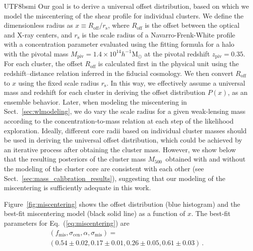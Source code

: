 \documentclass[longauth]{aa}
\newcommand{\Msunh}{\ensuremath{h^{-1}\mathrm{M}_{\odot}}}
\newcommand{\Mfiveoo}{\ensuremath{M_{500}}}
\newcommand{\MPIV}{\ensuremath{M_{\mathrm{piv}}}}
\newcommand{\ZPIV}{\ensuremath{z_{\mathrm{piv}}}}
\newcommand{\fmis}{\ensuremath{f_{\mathrm{mis}}}}
\newcommand{\sigmacen}{\ensuremath{{\sigma}_{\mathrm{cen}}}}
\newcommand{\sigmamis}{\ensuremath{{\sigma}_{\mathrm{mis}}}}
\begin{document}
\begin{CJK*}{UTF8}{bsmi}
Our goal is to derive a universal offset distribution, based on which we model the miscentering of the shear profile for individual clusters. 
We define the dimensionless radius as $x \equiv R_{\mathrm{off}} / r_{\mathrm{s}}$, where $R_{\mathrm{off}}$ is the offset between the optical and X-ray centers, and $r_{\mathrm{s}}$ is the scale radius of a Navarro-Frenk-White \citep[hereafter NFW;][]{navarro1997} profile with a concentration parameter evaluated using the \cite{diemer15} fitting formula for a halo with the pivotal mass $\MPIV = 1.4\times10^{14}\Msunh$ at the pivotal redshift $\ZPIV = 0.35$.
For each cluster, the offset $R_{\mathrm{off}}$ is calculated first in the physical unit using the redshift--distance relation inferred in the fiducial cosmology.
We then convert $R_{\mathrm{off}}$ to $x$ using the fixed scale radius $r_{\mathrm{s}}$.
In this way, we effectively assume a universal mass and redshift for each cluster in deriving the offset distribution $P(x)$, as an ensemble behavior.
Later, when modeling the miscentering in Sect.~\ref{sec:wlmodeling}, we do vary the scale radius for a given weak-lensing mass according to the concentration-to-mass relation at each step of the likelihood exploration.
Ideally, different core radii based on individual cluster masses should be used in deriving the universal offset distribution, which could be achieved by an iterative process after obtaining the cluster mass.
However, we show below that the resulting posteriors of the cluster mass \Mfiveoo\ obtained with and without the modeling of the cluster core are consistent with each other (see Sect.~\ref{sec:mass_calibration_results}), suggesting that our modeling of the miscentering is sufficiently adequate in this work.


Figure~\ref{fig:miscentering} shows the offset distribution (blue histogram) and the best-fit miscentering model (black solid line) as a function of $x$.
The best-fit parameters for Eq.~(\ref{eq:miscentering}) are
%
\begin{multline}
\left(\fmis, \sigmacen, \alpha, \sigmamis\right) = \\
\left(
0.54\pm0.02, 0.17\pm0.01, 0.26\pm0.05, 0.61\pm0.03 
\right) \, .
\end{multline}
%



\end{CJK*}
\end{document}
